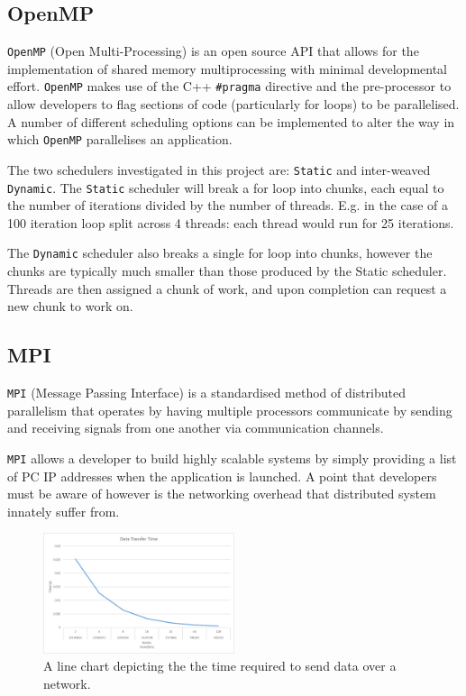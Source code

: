 \documentclass[journal,transmag]{IEEEtran}
\begin{document}
	\subsection{OpenMP}
		\texttt{OpenMP} (Open Multi-Processing) is an open source API that allows for the implementation of shared memory multiprocessing with minimal developmental effort. \texttt{OpenMP} makes use of the C++ \texttt{\#pragma} directive and the pre-processor to allow developers to flag sections of code (particularly for loops) to be parallelised. A number of different scheduling options can be implemented to alter the way in which \texttt{OpenMP} parallelises an application.
		
		The two schedulers investigated in this project are: \texttt{Static} and inter-weaved \texttt{Dynamic}. The \texttt{Static} scheduler will break a for loop into chunks, each equal to the number of iterations divided by the number of threads. E.g. in the case of a 100 iteration loop split across 4 threads: each thread would run for 25 iterations.
		
		The \texttt{Dynamic} scheduler also breaks a single for loop into chunks, however the chunks are typically much smaller than those produced by the Static scheduler. Threads are then assigned a chunk of work, and upon completion can request a new chunk to work on.
		

	\subsection{MPI}
		\texttt{MPI} (Message Passing Interface) is a standardised method of distributed parallelism that operates by having multiple processors communicate by sending and receiving signals from one another via communication channels. 
		
		\texttt{MPI} allows a developer to build highly scalable systems by simply providing a list of  PC IP addresses when the application is launched. A point that developers must be aware of however is the networking overhead that distributed system innately suffer from.

		\begin{figure}[h]
			\centering
			\includegraphics[width = 0.5\textwidth]{chartNetwork}
			\caption{A line chart depicting the the time required to send data over a network.}
			\label{fig_network}
		\end{figure}
		
\end{document}
